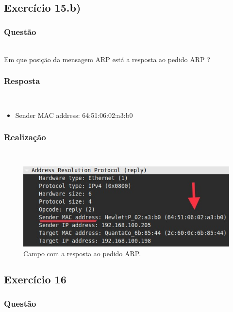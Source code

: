 \documentclass{llncs}
\begin{document}
\clearpage
\subsection{Exercício 15.b)}
\subsubsection{Questão}\rule[-10pt]{0pt}{10pt}\\

Em que posição da mensagem ARP está a resposta ao pedido ARP ?

\subsubsection{Resposta}\rule[-10pt]{0pt}{10pt}\\

\begin{itemize}
	\item Sender MAC address: 64:51:06:02:a3:b0
\end{itemize}

\subsubsection{Realização}\rule[-10pt]{0pt}{10pt}\\

\begin{figure}
  \begin{center}
	  \includegraphics[scale=0.6]{./imagens/arp_reply_resp.png} 
  \end{center}
	\caption{Campo com a resposta ao pedido ARP.}
  \label{fig:arp_reply_resp}
\end{figure} 


\clearpage
\subsection{Exercício 16}
\subsubsection{Questão}\rule[-10pt]{0pt}{10pt}\\
\end{document}
